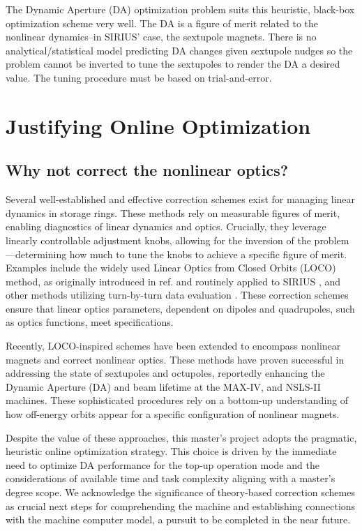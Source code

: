 The Dynamic Aperture (DA) optimization problem suits this heuristic, black-box optimization scheme very well. The DA is a figure of merit related to the nonlinear dynamics--in SIRIUS' case, the sextupole magnets. There is no analytical/statistical model predicting DA changes given sextupole nudges so the problem cannot be inverted to tune the sextupoles to render the DA a desired value. The tuning procedure must be based on trial-and-error.

\section{Justifying Online Optimization}
\subsection{Why not correct the nonlinear optics?}
Several well-established and effective correction schemes exist for managing linear dynamics in storage rings. These methods rely on measurable figures of merit, enabling diagnostics of linear dynamics and optics. Crucially, they leverage linearly controllable adjustment knobs, allowing for the inversion of the problem—determining how much to tune the knobs to achieve a specific figure of merit. Examples include the widely used Linear Optics from Closed Orbits (LOCO) method, as originally introduced in ref.\cite{safranek_experimental_1997} and routinely applied to SIRIUS \cite{alves_linear_2021, alves_optics_2021}, and other methods utilizing turn-by-turn data evaluation \cite[chapter 5]{huang_beam-based_2019}. These correction schemes ensure that linear optics parameters, dependent on dipoles and quadrupoles, such as optics functions, meet specifications.

Recently, LOCO-inspired schemes have been extended to encompass nonlinear magnets and correct nonlinear optics. These methods have proven successful in addressing the state of sextupoles and octupoles, reportedly enhancing the Dynamic Aperture (DA) and beam lifetime at the MAX-IV, \cite{olsson_nonlinear_2020} and NSLS-II \cite{li_nonlinear_2024} machines. These sophisticated procedures rely on a bottom-up understanding of how off-energy orbits appear for a specific configuration of nonlinear magnets.

Despite the value of these approaches, this master's project adopts the pragmatic, heuristic online optimization strategy. This choice is driven by the immediate need to optimize DA performance for the top-up operation mode and the considerations of available time and task complexity aligning with a master's degree scope. We acknowledge the significance of theory-based correction schemes as crucial next steps for comprehending the machine and establishing connections with the machine computer model, a pursuit to be completed in the near future.

